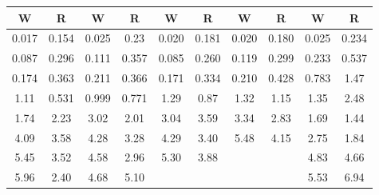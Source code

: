 \documentclass{article}
\begin{document}
\begin{CJK*}{UTF8}{song}
\begin{enumerate}[(a)]
					\begin{tabular}{cc|cc|cc|cc|cc}
						\hline
						W & R &W &R& W& R& W& R& W& R \\
						\hline
						0.017 &0.154 &0.025 &0.23& 0.020 &0.181 &0.020& 0.180& 0.025 &0.234 \\
						0.087 &0.296 &0.111 &0.357 &0.085 &0.260 &0.119 &0.299 &0.233 &0.537 \\
						0.174 &0.363 &0.211 &0.366 &0.171 &0.334 &0.210 &0.428 &0.783 &1.47 \\
						1.11 &0.531 &0.999 &0.771 &1.29 &0.87 &1.32 &1.15 &1.35 &2.48 \\
						1.74 &2.23 &3.02 &2.01 &3.04 &3.59 &3.34 &2.83 &1.69 &1.44 \\
						4.09 &3.58 &4.28 &3.28 &4.29 &3.40 &5.48 &4.15 &2.75 &1.84 \\
						5.45 &3.52 &4.58 &2.96 &5.30 &3.88 &     &     &4.83 &4.66 \\
						5.96 &2.40 &4.68 &5.10 &     &     &     &     &5.53 &6.94 \\
						\hline
					\end{tabular}
				\end{enumerate} 

\end{CJK*}
\end{document}
